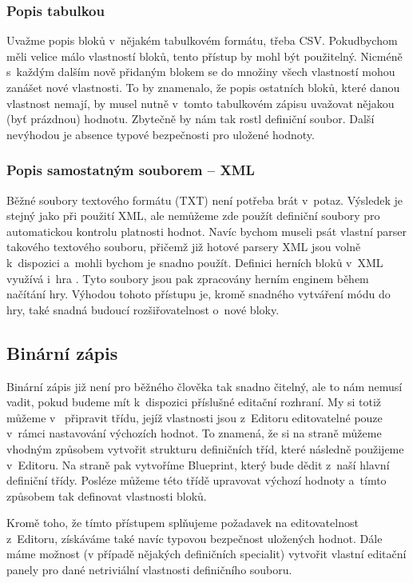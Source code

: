 \subsubsection{Popis tabulkou}
Uvažme popis bloků v~nějakém tabulkovém formátu, třeba CSV. Pokud\linebreak bychom měli velice málo vlastností bloků, tento přístup by mohl být použitelný. Nicméně s~každým dalším nově přidaným blokem se do množiny všech vlastností mohou zanášet nové vlastnosti. To by znamenalo, že popis ostatních bloků, které danou vlastnost nemají, by musel nutně v~tomto tabulkovém zápisu uvažovat nějakou (byť prázdnou) hodnotu. Zbytečně by nám tak rostl definiční soubor. Další nevýhodou je absence typové bezpečnosti pro uložené hodnoty. 

\subsubsection{Popis samostatným souborem -- XML}
Běžné soubory textového formátu (TXT) není potřeba brát v~potaz. Výsledek je stejný jako při použití XML, ale nemůžeme zde použít definiční soubory pro automatickou kontrolu platnosti hodnot. Navíc bychom museli psát vlastní parser takového textového souboru, přičemž již hotové parsery XML jsou volně k~dispozici a~mohli bychom je snadno použít. Definici herních bloků v~XML využívá i~hra \ME{}. Tyto soubory jsou pak zpracovány herním enginem během načítání hry. Výhodou tohoto přístupu je, kromě snadného vytváření módu do hry, také snadná budoucí rozšiřovatelnost o~nové bloky.

\subsection{Binární zápis}
Binární zápis již není pro běžného člověka tak snadno čitelný, ale to nám nemusí vadit, pokud budeme mít k~dispozici příslušné editační rozhraní. My si totiž můžeme v~\UEu{} připravit třídu, jejíž vlastnosti jsou z~Editoru editovatelné pouze v~rámci nastavování výchozích hodnot. To znamená, že si na straně \CPP{} můžeme vhodným způsobem vytvořit strukturu definičních tříd, které následně použijeme v~Editoru. Na straně \UEu{} pak vytvoříme Blueprint, který bude dědit z~naší hlavní definiční třídy. Posléze můžeme této třídě upravovat výchozí hodnoty a~tímto způsobem tak definovat vlastnosti bloků.

Kromě toho, že tímto přístupem splňujeme požadavek na editovatelnost z~Editoru, získáváme také navíc typovou bezpečnost uložených hodnot. Dále máme možnost (v případě nějakých definičních specialit) vytvořit vlastní editační panely pro dané netriviální vlastnosti definičního souboru. 


